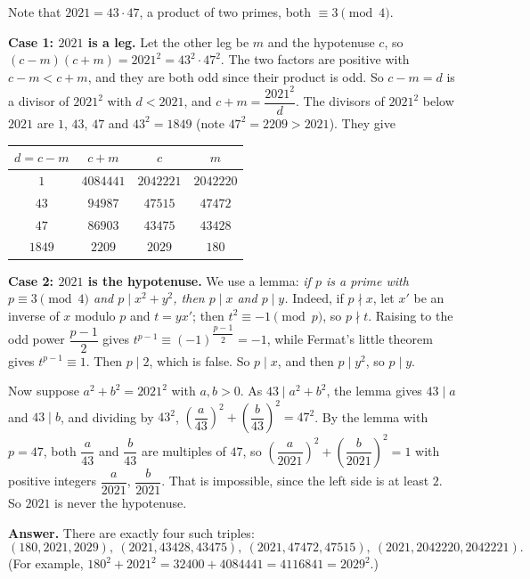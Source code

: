 Note that $2021=43\cdot47$, a product of two primes, both $\equiv3\pmod4$.

\textbf{Case 1: $2021$ is a leg.} Let the other leg be $m$ and the hypotenuse $c$, so $(c-m)(c+m)=2021^2=43^2\cdot47^2$. The two factors are positive with $c-m<c+m$, and they are both odd since their product is odd. So $c-m=d$ is a divisor of $2021^2$ with $d<2021$, and $c+m=\dfrac{2021^2}{d}$. The divisors of $2021^2$ below $2021$ are $1$, $43$, $47$ and $43^2=1849$ (note $47^2=2209>2021$). They give
\begin{center}
\begin{tabular}{c|c|c|c}
$d=c-m$ & $c+m$ & $c$ & $m$\\
\hline
$1$ & $4084441$ & $2042221$ & $2042220$\\
$43$ & $94987$ & $47515$ & $47472$\\
$47$ & $86903$ & $43475$ & $43428$\\
$1849$ & $2209$ & $2029$ & $180$
\end{tabular}
\end{center}

\textbf{Case 2: $2021$ is the hypotenuse.} We use a lemma: \emph{if $p$ is a prime with $p\equiv3\pmod4$ and $p\mid x^2+y^2$, then $p\mid x$ and $p\mid y$.} Indeed, if $p\nmid x$, let $x'$ be an inverse of $x$ modulo $p$ and $t=yx'$; then $t^2\equiv-1\pmod p$, so $p\nmid t$. Raising to the odd power $\dfrac{p-1}{2}$ gives $t^{p-1}\equiv(-1)^{\dfrac{p-1}{2}}=-1$, while Fermat's little theorem gives $t^{p-1}\equiv1$. Then $p\mid2$, which is false. So $p\mid x$, and then $p\mid y^2$, so $p\mid y$.

Now suppose $a^2+b^2=2021^2$ with $a,b>0$. As $43\mid a^2+b^2$, the lemma gives $43\mid a$ and $43\mid b$, and dividing by $43^2$, $\left(\dfrac a{43}\right)^2+\left(\dfrac b{43}\right)^2=47^2$. By the lemma with $p=47$, both $\dfrac a{43}$ and $\dfrac b{43}$ are multiples of $47$, so $\left(\dfrac{a}{2021}\right)^2+\left(\dfrac{b}{2021}\right)^2=1$ with positive integers $\dfrac{a}{2021}$, $\dfrac{b}{2021}$. That is impossible, since the left side is at least $2$. So $2021$ is never the hypotenuse.

\textbf{Answer.} There are exactly four such triples:
\[\boxed{(180,2021,2029),\ (2021,43428,43475),\ (2021,47472,47515),\ (2021,2042220,2042221)}.\]
(For example, $180^2+2021^2=32400+4084441=4116841=2029^2$.)
